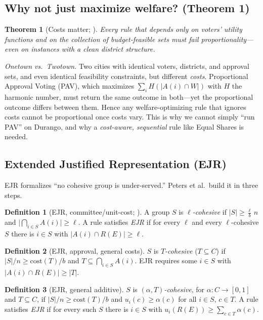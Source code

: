 \documentclass[11pt,letterpaper]{article}
\theoremstyle{definition}
\newtheorem{definition}{Definition}[section]
\theoremstyle{plain}
\newtheorem{theorem}{Theorem}[section]
\theoremstyle{remark}
\newcommand{\projects}{C}          %
\newcommand{\budget}{b}            %
\newcommand{\cost}{\mathrm{cost}}  %
\begin{document}
\subsection{Why not just maximize welfare? (Theorem 1)}

\begin{theorem}[Costs matter; \citealp{peters2021}]
\label{thm:welfarism}
Every rule that depends only on voters' utility functions and on the collection of budget-feasible
sets must fail proportionality---even on instances with a clean district structure.
\end{theorem}

\begin{intuition}
\emph{Onetown vs.\ Twotown.} Two cities with identical voters, districts, and approval sets, and
even identical feasibility constraints, but different \emph{costs}. Proportional Approval Voting
(PAV), which maximizes $\sum_i H(|A(i)\cap W|)$ with $H$ the harmonic number, must return the same
outcome in both---yet the proportional outcome differs between them. Hence any welfare-optimizing
rule that ignores costs cannot be proportional once costs vary. This is why we cannot simply ``run
PAV'' on Durango, and why a \emph{cost-aware, sequential} rule like Equal Shares is needed.
\end{intuition}

\subsection{Extended Justified Representation (EJR)}

EJR formalizes ``no cohesive group is under-served.'' Peters et al.\ build it in three steps.

\begin{definition}[EJR, committee/unit-cost; \citealp{aziz2017}]
A group $S$ is \emph{$\ell$-cohesive} if $|S|\ge \tfrac{\ell}{\budget}\,n$ and
$\bigl|\bigcap_{i\in S}A(i)\bigr|\ge \ell$. A rule satisfies \emph{EJR} if for every $\ell$ and
every $\ell$-cohesive $S$ there is $i\in S$ with $|A(i)\cap R(E)|\ge \ell$.
\end{definition}

\begin{definition}[EJR, approval, general costs]
$S$ is \emph{$T$-cohesive} ($T\subseteq \projects$) if $|S|/n\ge \cost(T)/\budget$ and
$T\subseteq\bigcap_{i\in S}A(i)$. EJR requires some $i\in S$ with $|A(i)\cap R(E)|\ge |T|$.
\end{definition}

\begin{definition}[EJR, general additive]
\label{def:ejr}
$S$ is \emph{$(\alpha,T)$-cohesive}, for $\alpha\colon \projects\to[0,1]$ and $T\subseteq
\projects$, if $|S|/n\ge \cost(T)/\budget$ and $u_i(c)\ge \alpha(c)$ for all $i\in S,\,c\in T$. A
rule satisfies \emph{EJR} if for every such $S$ there is $i\in S$ with
$u_i(R(E))\ge \sum_{c\in T}\alpha(c)$.
\end{definition}
\end{document}
